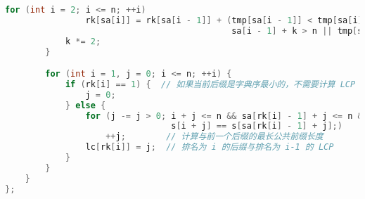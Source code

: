 \begin{lstlisting}[language=C++]
            for (int i = 2; i <= n; ++i)
                rk[sa[i]] = rk[sa[i - 1]] + (tmp[sa[i - 1]] < tmp[sa[i]] ||
                                             sa[i - 1] + k > n || tmp[sa[i - 1] + k] < tmp[sa[i] + k]);  // 基于前后部分进行比较
            k *= 2;                                                                                      // 将 k 翻倍，以便在下一个循环中比较更长的前缀
        }

        for (int i = 1, j = 0; i <= n; ++i) {
            if (rk[i] == 1) {  // 如果当前后缀是字典序最小的，不需要计算 LCP
                j = 0;
            } else {
                for (j -= j > 0; i + j <= n && sa[rk[i] - 1] + j <= n &&
                                 s[i + j] == s[sa[rk[i] - 1] + j];)
                    ++j;        // 计算与前一个后缀的最长公共前缀长度
                lc[rk[i]] = j;  // 排名为 i 的后缀与排名为 i-1 的 LCP
            }
        }
    }
};
\end{lstlisting}
